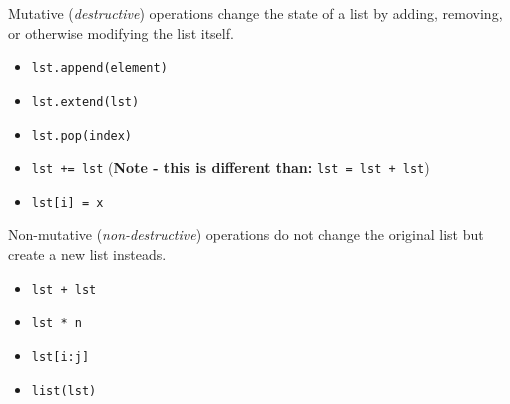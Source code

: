 \begin{blocksection}
Mutative (\emph{destructive}) operations change the state of a list by adding,
removing, or otherwise modifying the list itself.

\begin{itemize}
\item \lstinline$lst.append(element)$
\item \lstinline$lst.extend(lst)$
\item \lstinline$lst.pop(index)$
\item \lstinline$lst += lst$ (\textbf{Note - this is different than:} \lstinline$lst = lst + lst$)
\item \lstinline$lst[i] = x$
\end{itemize}
\end{blocksection}

\vspace{\parskip}

\begin{blocksection}
Non-mutative (\emph{non-destructive}) operations do not change the original list but create a new list insteads.

\begin{itemize}
\item \lstinline$lst + lst$
\item \lstinline$lst * n$
\item \lstinline$lst[i:j]$
\item \lstinline$list(lst)$
\end{itemize}
\end{blocksection}

\vspace{\parskip}
